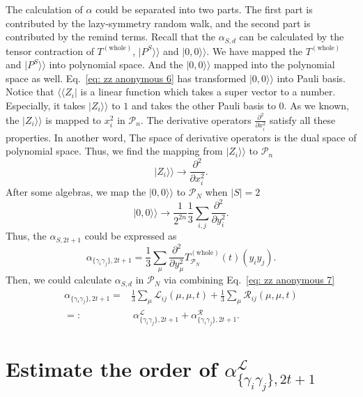 \documentclass{article}
\newcommand{\Twhole}{T^{(\text{whole})}}
\newcommand{\alpl}{\alpha_{\{\gamma_i\gamma_j\}, 2t+1}^{\mathscr{L}}}
\newcommand{\supket}[1]{|#1 \rangle\rangle}
\newcommand{\supbra}[1]{\langle\langle #1 |}
\begin{document}
The calculation of $\alpha$ could be separated into two parts. The first part is contributed by the lazy-symmetry random walk, and the second part is contributed by the remind terms. Recall that the $\alpha_{S, d}$ can be calculated by the tensor contraction of $\Twhole$, $\supket{P^S}$ and $\supket{0,0}$. We have mapped the $\Twhole$ and $\supket{P^S}$ into polynomial space. And the $\supket{0,0}$ mapped into the polynomial space as well. Eq.~\eqref{eq: zz anonymous 6} has transformed $\supket{0,0}$ into Pauli basis. Notice that  $\supbra{Z_i}$ is a linear function which takes a super vector to a number. Especially, it takes $\supket{Z_i}$ to $1$ and takes the other Pauli basis to $0$. As we known, the $\supket{Z_i}$ is mapped to $x_i^2$ in $\mathcal{P}_n$. The derivative operators $\frac{\partial^2}{\partial x_i^2 }$ satisfy all these properties. 
In another word, The space of derivative operators is the dual space of polynomial space. 
Thus, we find the mapping from $\supket{Z_i}$ to $\mathcal{P}_n$
\begin{equation}
    \supket{Z_i} \to \frac{\partial^2}{\partial x_i^2 }.
\end{equation}
After some algebras, we map the $\supket{0,0}$ to $\mathcal{P}_N$ when $|S| = 2$
\begin{equation}
    \supket{0,0} \to \frac{1}{2^{2n}} \frac{1}{3} \sum_{i,j} \frac{\partial^2}{\partial y_i^2 }.
\end{equation}
Thus, the $\alpha_{S,2t+1}$ could be expressed as
\begin{equation}
    \alpha_{\{\gamma_i\gamma_j\},2t+1} = \frac{1}{3} \sum_{\mu} \frac{\partial^2}{\partial y_\mu^2 } \Twhole_{\mathcal{P}_N}(t) (y_i y_j).
\end{equation}
Then, we could calculate $\alpha_{S,d}$ in $\mathcal{P}_N$ via combining Eq.~\eqref{eq: zz anonymous 7}
\begin{align}
    \alpha_{\{\gamma_i\gamma_j\},2t+1} =& \frac{1}{3} \sum_\mu \mathscr{L}_{ij} (\mu, \mu, t) + \frac{1}{3} \sum_\mu \mathscr{R}_{ij} (\mu, \mu, t) \\
    =:& ~\alpl + \alpha_{\{\gamma_i\gamma_j\}, 2t+1}^{\mathscr{R}}.
    \label{eq: zz anonymous 24}
\end{align}


\section{Estimate the order of $\alpl$}
\end{document}
